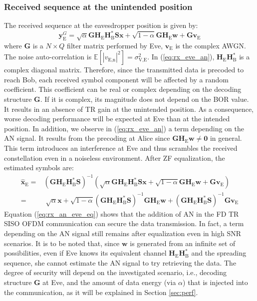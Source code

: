 \documentclass[journal,comsoc]{IEEEtran}
\newcommand{\EX}[1]{\mathbb{E} \left[#1\right]}%
\newcommand{\HE}{\textbf{H}_{\text{E}}}
\newcommand{\HB}{\textbf{H}_{\text{B}}}
\newcommand{\spread}{\textbf{S}}
\newcommand{\w}{\textbf{w}}
\begin{document}
\subsubsection{Received sequence at the unintended position}
The received sequence at the eavesdropper position is given by:
\begin{equation}
\textbf{y}_{\text{E}}^G = \sqrt{\alpha}  \textbf{G} \HE \HB^* \spread\textbf{x} + \sqrt{1-\alpha} \textbf{G} \HE \w + \textbf{G}  \textbf{v}_\text{E}
\label{eq:rx_eve_an}
\end{equation}
where $\textbf{G}$ is a $N \times Q$ filter matrix performed by Eve, $\textbf{v}_\text{E}$ is the complex AWGN. The noise auto-correlation is $\EX{|v_{\text{E,n}}|^2} = \sigma_{\text{V,E}}^2$.  In (\ref{eq:rx_eve_an}), $\HE \HB^*$ is a complex diagonal matrix. Therefore, since the transmitted data is precoded to reach Bob, each received symbol component will be affected by a random coefficient. This coefficient can be real or complex depending on the decoding structure $\textbf{G}$. If it is complex, its magnitude does not depend on the BOR value. It results in an absence of TR gain at the unintended position. As a consequence, worse decoding performance will be expected at Eve than at the intended position. In addition, we observe in (\ref{eq:rx_eve_an}) a term depending on the AN signal. It results from the precoding at Alice since $\textbf{G}\HE \w \neq \textbf{0}$ in general. This term introduces an interference at Eve and thus scrambles the received constellation even in a noiseless environment. After ZF equalization, the estimated symbols are:
\begin{equation}
\begin{split}
\hat{\textbf{x}}_{\text{E}} =& \left(\textbf{G} \HE \HB^* \spread \right)^{-1}
\left( \sqrt{\alpha} \textbf{G} \HE \HB^* \spread \textbf{x} +   \sqrt{1-\alpha} \textbf{G} \HE \w  +  \textbf{G}  \textbf{v}_\text{E}  \right) \\
=& \;\sqrt{\alpha}\textbf{x} + \sqrt{1-\alpha} \left(\textbf{G} \HE \HB^* \spread \right)^{-1}  \textbf{G} \HE \w + \left(\textbf{G} \HE \HB^* \spread \right)^{-1}  \textbf{G} \textbf{v}_\text{E}
\end{split}
\label{eq:rx_an_eve_eq}
\end{equation}
Equation (\ref{eq:rx_an_eve_eq}) shows that the addition of AN in the FD TR SISO OFDM communication can secure the data transmission. In fact, a term depending on the AN signal still remains after equalization even in high SNR scenarios. It is to be noted that, since $\w$ is generated from an infinite set of possibilities, even if Eve knows its equivalent channel $\HE\HB^*$ and the spreading sequence, she cannot estimate the AN signal  to try retrieving the data.  The degree of security will depend on the investigated scenario, i.e., decoding structure $\textbf{G}$ at Eve, and the amount of data energy (via $\alpha$) that is injected into the communication, as it will be explained in Section \ref{sec:perf}.
\end{document}
